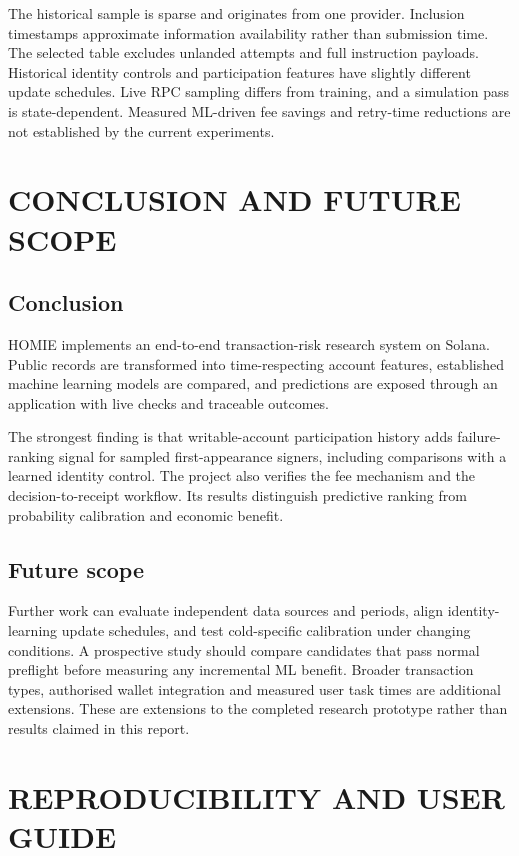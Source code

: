 \documentclass[12pt,a4paper,oneside]{report}
\begin{document}
The historical sample is sparse and originates from one provider. Inclusion timestamps approximate information availability rather than submission time. The selected table excludes unlanded attempts and full instruction payloads. Historical identity controls and participation features have slightly different update schedules. Live RPC sampling differs from training, and a simulation pass is state-dependent. Measured ML-driven fee savings and retry-time reductions are not established by the current experiments.
\chapter{CONCLUSION AND FUTURE SCOPE}
\section{Conclusion}
HOMIE implements an end-to-end transaction-risk research system on Solana. Public records are transformed into time-respecting account features, established machine learning models are compared, and predictions are exposed through an application with live checks and traceable outcomes.

The strongest finding is that writable-account participation history adds failure-ranking signal for sampled first-appearance signers, including comparisons with a learned identity control. The project also verifies the fee mechanism and the decision-to-receipt workflow. Its results distinguish predictive ranking from probability calibration and economic benefit.
\section{Future scope}
Further work can evaluate independent data sources and periods, align identity-learning update schedules, and test cold-specific calibration under changing conditions. A prospective study should compare candidates that pass normal preflight before measuring any incremental ML benefit. Broader transaction types, authorised wallet integration and measured user task times are additional extensions. These are extensions to the completed research prototype rather than results claimed in this report.

\appendix
\chapter{REPRODUCIBILITY AND USER GUIDE}
\end{document}
